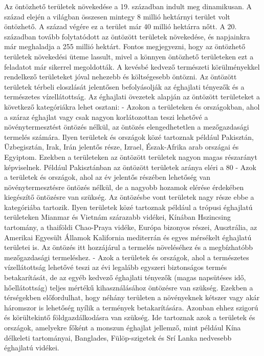 \documentclass[a4paper,oneside,onecolumn,12pt]{LegrandOrangeBook}
\begin{document}
	Az öntözhető területek növekedése a 19. században indult meg dinamikusan. A század elején a világban összesen mintegy 8 millió hektárnyi terület volt öntözhető. A század végére ez a terület már 40 millió hektárra nőtt. A 20. században tovább folytatódott az öntözött területek növekedése, és napjainkra már meghaladja a 255 millió hektárt. Fontos megjegyezni, hogy az öntözhető területek növekedési üteme lassult, mivel a könnyen öntözhető területeken ezt a feladatot már sikerrel megoldották. A kevésbé kedvező természeti körülményekkel rendelkező területeket jóval nehezebb és költségesebb öntözni.
	Az öntözött területek térbeli eloszlását jelentősen befolyásolják az éghajlati tényezők és a természetes vízellátottság. Az éghajlati övezetek alapján az öntözött területeket a következő kategóriákra lehet osztani:
-	Azokon a területeken és országokban, ahol a száraz éghajlat vagy csak nagyon korlátozottan teszi lehetővé a növénytermesztést öntözés nélkül, az öntözés elengedhetetlen a mezőgazdasági termelés számára. Ilyen területek és országok közé tartoznak például Pakisztán, Üzbegisztán, Irak, Irán jelentős része, Izrael, Észak-Afrika arab országai és Egyiptom. Ezekben a területeken az öntözött területek nagyon magas részarányt képviselnek. Például Pakisztánban az öntözött területek aránya eléri a 80%
-	Azok a területek és országok, ahol az év jelentős részében lehetőség van növénytermesztésre öntözés nélkül, de a nagyobb hozamok elérése érdekében kiegészítő öntözésre van szükség. Az öntözésbe vont területek nagy része ebbe a kategóriába tartozik. Ilyen területek közé tartoznak például a trópusi éghajlatú területeken Mianmar és Vietnám szárazabb vidékei, Kínában Hszincsing tartomány, a thaiföldi Chao-Praya vidéke, Európa bizonyos részei, Ausztrália, az Amerikai Egyesült Államok Kalifornia mediterrán és egyes mérsékelt éghajlatú területei is. Az öntözés itt hozzájárul a termelés növeléséhez és a megbízhatóbb mezőgazdasági termeléshez.
-	Azok a területek és országok, ahol a természetes vízellátottság lehetővé teszi az évi legalább egyszeri biztonságos termés betakarítását, de az egyéb kedvező éghajlati tényezők (magas napsütéses idő, hőellátottság) teljes mértékű kihasználásához öntözésre van szükség. Ezekben a térségekben előfordulhat, hogy néhány területen a növényeknek kétszer vagy akár háromszor is lehetőség nyílik a termények betakarítására. Azonban ehhez szigorú és körültekintő földgazdálkodásra van szükség. Ide tartoznak azok a területek és országok, amelyekre főként a monszun éghajlat jellemző, mint például Kína délkeleti tartományai, Banglades, Fülöp-szigetek és Srí Lanka nedvesebb éghajlatú vidékei.
\end{document}
